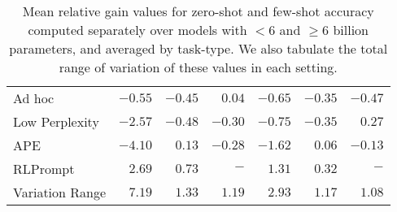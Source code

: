 \begin{table}[t]
{\begin{tabular}{lrrrrrr}
Ad hoc              &  $-0.55$ & $-0.45$ &  $0.04$ &                            $-0.65$ & $-0.35$ & $-0.47$ \\
Low Perplexity      & $-2.57$ & $-0.48$ & $-0.30$ &                             $-0.75$ & $-0.35$ &  $0.27$ \\
APE                 & $-4.10$ &  $0.13$ & $-0.28$ &                             $-1.62$ &  $0.06$ & $-0.13$ \\
RLPrompt            &  $2.69$ &  $0.73$ &     $-$ &                             $\mathbf{1.31}$ &  $0.32$ &     $-$ \\
\midrule
Variation Range     & $7.19$ & $1.33$ & $1.19$ & $2.93$ & $1.17$ & $1.08$ \\
\bottomrule
\end{tabular}}
\caption{Mean relative gain values for zero-shot and few-shot accuracy computed separately over models with $<6$ and $\ge 6$ billion parameters, and averaged by task-type. We also tabulate the total range of variation of these values in each setting.
}
\label{table:accuracy_perc_scale_separated}
\end{table}